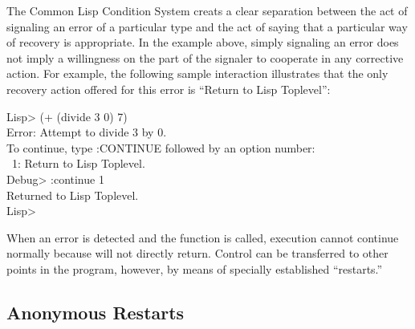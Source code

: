 The Common Lisp Condition System creats a clear
separation between the act of signaling an error of a particular type and the
act of saying that a particular way of recovery is appropriate. In the 
example above, simply signaling an error does not imply a willingness on the
part of the signaler to cooperate in any corrective action. For example, the
following sample interaction illustrates that the only recovery action
offered for this error is ``Return to Lisp Toplevel'':
\begin{lisp}
Lisp> (+ (divide 3 0) 7) \\
Error: Attempt to divide 3 by 0. \\
To continue, type :CONTINUE followed by an option number: \\
~1: Return to Lisp Toplevel. \\
Debug> :continue 1 \\
Returned to Lisp Toplevel. \\
Lisp>
\end{lisp}
When an error is detected and the function  is called, execution cannot
continue normally because  will not directly return. Control can be
transferred to other points in the program, however, by means of specially
established ``restarts.''

\subsection{Anonymous Restarts}

